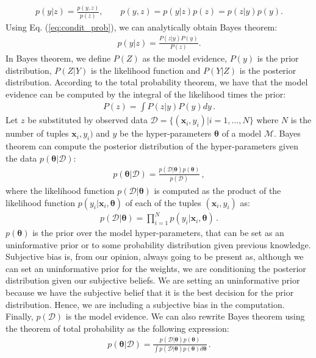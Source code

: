 \begin{align}
p(y|z) = \frac{p(y,z)}{p(z)}, \quad \quad p(y,z) = p(y|z) p(z) = p(z|y) p(y).
\label{eq:condit_prob}
\end{align}
Using Eq. (\ref{eq:condit_prob}), we can analytically obtain Bayes theorem:
\begin{align}
p(y|z) = \frac{P(z|y)P(y)}{P(z)}.
\end{align}
In Bayes theorem, we define $P(Z)$ as the model evidence, $P(y)$ is the prior distribution, $P(Z|Y)$ is the likelihood function and $P(Y|Z)$ is the posterior distribution. According to the total probability theorem, we have that the model evidence can be computed by the integral of the likelihood times the prior:
\begin{align}
P(z) = \int P(z|y)P(y) dy\,.
\end{align}
Let $z$ be substituted by observed data $\mathcal{D} = \{(\mathbf{x}_i, y_i)| i = 1,...,N\}$ where $N$ is the number of tuples $\mathbf{x}_i, y_i)$ and $y$ be the hyper-parameters $\boldsymbol{\theta}$ of a model $\mathcal{M}$. Bayes theorem can compute the posterior distribution of the hyper-parameters given the data $p(\boldsymbol{\theta}|\mathcal{D})$:
\begin{align}
p(\boldsymbol{\theta}|\mathcal{D}) = \frac{p(\mathcal{D}|\boldsymbol{\theta})p(\boldsymbol{\theta})}{p(\mathcal{D})}\,,
\end{align}
where the likelihood function $p(\mathcal{D}|\boldsymbol{\theta})$ is computed as the product of the likelihood function $p(y_i|\mathbf{x}_i, \boldsymbol{\theta})$ of each of the tuples $(\mathbf{x}_i, y_i)$ as:
\begin{align}
p(\mathcal{D}|\boldsymbol{\theta}) = \prod_{i=1}^{N} p(y_i|\mathbf{x}_i, \boldsymbol{\theta})\,.
\end{align}
$p(\boldsymbol{\theta})$ is the prior over the model hyper-parameters, that can be set as an uninformative prior or to some probability distribution given previous knowledge. Subjective bias is, from our opinion, always going to be present as, although we can set an uninformative prior for the weights, we are conditioning the posterior distribution given our subjective beliefs. We are setting an uninformative prior because we have the subjective belief that it is the best decision for the prior distribution. Hence, we are including a subjective bias in the computation. Finally, $p(\mathcal{D})$ is the model evidence. We can also rewrite Bayes theorem using the theorem of total probability as the following expression:
\begin{align}
p(\boldsymbol{\theta}|\mathcal{D}) = \frac{p(\mathcal{D}|\boldsymbol{\theta})p(\boldsymbol{\theta})}{\int p(\mathcal{D}|\boldsymbol{\theta})p(\boldsymbol{\theta}) d\boldsymbol{\theta}}\,.
\end{align}
